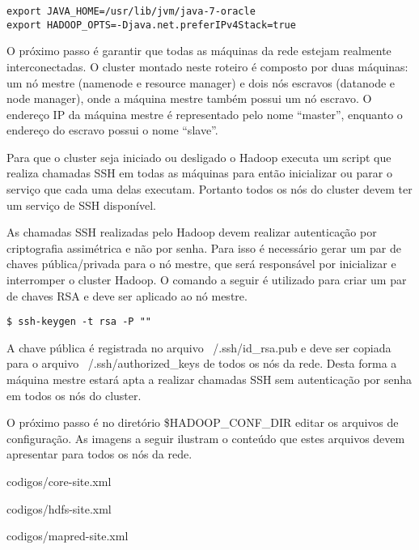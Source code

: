\begin{apendicesenv}
\begin{lstlisting}[style=abnt,frame=single]
export JAVA_HOME=/usr/lib/jvm/java-7-oracle
export HADOOP_OPTS=-Djava.net.preferIPv4Stack=true 
\end{lstlisting}


O próximo passo é garantir que todas as máquinas da rede estejam realmente interconectadas. O cluster montado neste roteiro é composto por duas máquinas: um nó mestre (namenode e resource manager) e dois nós escravos (datanode e node manager), onde a máquina mestre também possui um nó escravo. O endereço IP da máquina mestre é representado pelo nome “master”, enquanto o endereço do escravo possui o nome “slave”.

Para que o cluster seja iniciado ou desligado o Hadoop executa um script que realiza chamadas SSH em todas as máquinas para então inicializar ou parar o serviço que cada uma delas executam. Portanto todos os nós do cluster devem ter um serviço de SSH disponível.

As chamadas SSH realizadas pelo Hadoop devem realizar autenticação por criptografia assimétrica e não por senha. Para isso é necessário gerar um par de chaves pública/privada para o nó mestre, que será responsável por inicializar e interromper o cluster Hadoop. O comando a seguir é utilizado para criar um par de chaves RSA e deve ser aplicado ao nó mestre.

\begin{lstlisting}[style=abnt,frame=single]
$ ssh-keygen -t rsa -P ""
\end{lstlisting}

A chave pública é registrada no arquivo ~/.ssh/id\_rsa.pub e deve ser copiada para o arquivo ~/.ssh/authorized\_keys de todos os nós da rede. Desta forma a máquina mestre estará apta a realizar chamadas SSH sem autenticação por senha em todos os nós do cluster.

O próximo passo é no diretório \$HADOOP\_CONF\_DIR editar os arquivos de configuração. As imagens a seguir ilustram o conteúdo que estes arquivos devem apresentar para todos os nós da rede.


		{codigos/core-site.xml}

\newpage

		{codigos/hdfs-site.xml}


		{codigos/mapred-site.xml}


\end{apendicesenv}
